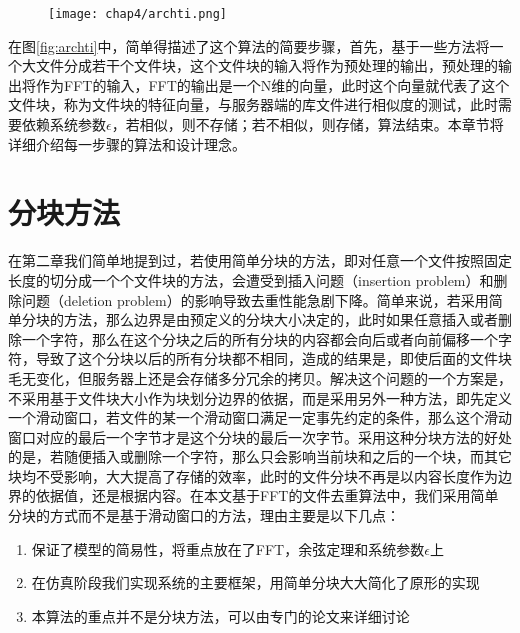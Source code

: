 \begin{figure}[!hbp]
    \begin{minipage}[b]{0.6\textwidth}
    \captionstyle{\centering}
    \centering
    \texttt{[image: chap4/archti.png]}
    \end{minipage}     
\end{figure}

在图\ref{fig:archti}中，简单得描述了这个算法的简要步骤，首先，基于一些方法将一个大文件分成若干个文件块，这个文件块的输入将作为预处理的输出，预处理的输出将作为FFT的输入，FFT的输出是一个N维的向量，此时这个向量就代表了这个文件块，称为文件块的特征向量，与服务器端的库文件进行相似度的测试，此时需要依赖系统参数$\epsilon$，若相似，则不存储；若不相似，则存储，算法结束。本章节将详细介绍每一步骤的算法和设计理念。

\section{分块方法}
\label{sec:choice}

在第二章我们简单地提到过，若使用简单分块的方法，即对任意一个文件按照固定长度的切分成一个个文件块的方法，会遭受到插入问题（insertion problem）和删除问题（deletion problem）的影响导致去重性能急剧下降。简单来说，若采用简单分块的方法，那么边界是由预定义的分块大小决定的，此时如果任意插入或者删除一个字符，那么在这个分块之后的所有分块的内容都会向后或者向前偏移一个字符，导致了这个分块以后的所有分块都不相同，造成的结果是，即使后面的文件块毛无变化，但服务器上还是会存储多分冗余的拷贝。解决这个问题的一个方案是，不采用基于文件块大小作为块划分边界的依据，而是采用另外一种方法，即先定义一个滑动窗口，若文件的某一个滑动窗口满足一定事先约定的条件，那么这个滑动窗口对应的最后一个字节才是这个分块的最后一次字节。采用这种分块方法的好处的是，若随便插入或删除一个字符，那么只会影响当前块和之后的一个块，而其它块均不受影响，大大提高了存储的效率，此时的文件分块不再是以内容长度作为边界的依据值，还是根据内容。在本文基于FFT的文件去重算法中，我们采用简单分块的方式而不是基于滑动窗口的方法，理由主要是以下几点：

\begin{enumerate}
\item 保证了模型的简易性，将重点放在了FFT，余弦定理和系统参数$\epsilon$上
\item 在仿真阶段我们实现系统的主要框架，用简单分块大大简化了原形的实现
\item 本算法的重点并不是分块方法，可以由专门的论文来详细讨论
\end{enumerate}

